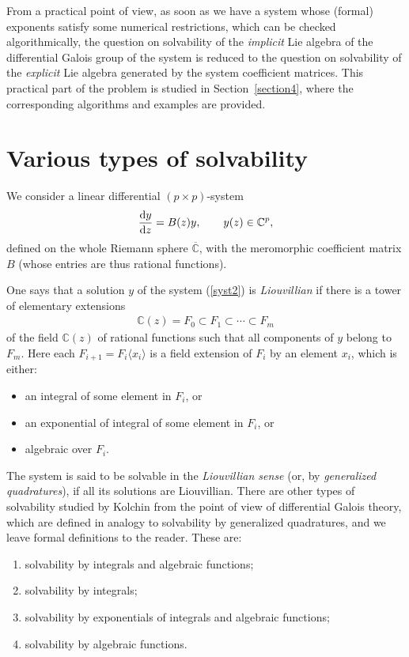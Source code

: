 From a practical point of view, as soon as we have a system whose (formal) exponents satisfy some numerical restrictions, which can be checked algorithmically, the question on solvability of the {\it implicit} Lie algebra of the differential Galois group of the system is reduced to the question on solvability of the {\it explicit} Lie algebra generated by the system coefficient matrices. This practical part of the problem is studied in Section~\ref{section4}, where the corresponding algorithms and examples are provided.

\section{Various types of solvability}\label{section2}

We consider a linear differential $(p\times p)$-system
\begin{gather}\label{syst2}
\frac{{\rm d}y}{{\rm d}z}=B(z) y,\qquad y(z)\in{\mathbb C}^p,
\end{gather}
defined on the whole Riemann sphere $\overline{\mathbb C}$, with the meromorphic coefficient matrix $B$ (whose entries are
thus rational functions).

One says that a solution $y$ of the system (\ref{syst2}) is {\it Liouvillian} if there is a tower of elementary
extensions
\begin{gather*}
{\mathbb C}(z)=F_0\subset F_1\subset\cdots\subset F_m
\end{gather*}
of the field ${\mathbb C}(z)$ of rational functions such that all components of $y$ belong to $F_m$. Here each
$F_{i+1}=F_i\langle x_i\rangle$ is a field extension of $F_i$ by an element $x_i$, which is either:
\begin{itemize}	\itemsep=0pt
	\item[--] an integral of some element in $F_i$, or
	\item[--] an exponential of integral of some element in $F_i$, or
	\item[--] algebraic over $F_i$.
\end{itemize}
The system is said to be solvable in the {\it Liouvillian sense} (or, by {\it generalized quadratures}),
if all its solutions are Liouvillian. There are other types of solvability studied by Kolchin \cite{Ko} from the point of
view of differential Galois theory, which are defined in analogy to solvability by generalized quadratures, and we leave
formal definitions to the reader. These are:
\begin{enumerate}	\itemsep=0pt
	\item[1)] solvability by integrals and algebraic functions;
	\item[2)] solvability by integrals;
	\item[3)] solvability by exponentials of integrals and algebraic functions;
	\item[4)] solvability by algebraic functions.
\end{enumerate}

